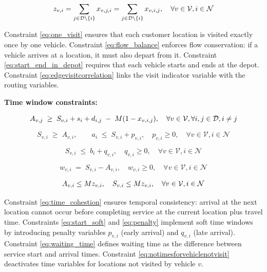\begin{equation}{\label{eq:edgevisitcorrelation}}
    z_{v,i} = \sum_{j\in \mathcal{D}\setminus\{i\}}x_{v,j,i} = \sum_{j\in \mathcal{D}\setminus\{i\}}x_{v,i,j}, \quad \forall v \in \mathcal{V}, i \in \mathcal{N}
\end{equation}

Constraint \ref{eq:one_visit} ensures that each customer location is visited exactly once by one vehicle. Constraint \ref{eq:flow_balance} enforces flow conservation: if a vehicle arrives at a location, it must also depart from it. Constraint \ref{eq:start_end_in_depot} requires that each vehicle starts and ends at the depot. Constraint \ref{eq:edgevisitcorrelation} links the visit indicator variable with the routing variables.

\textbf{Time window constraints:}

\begin{equation}{\label{eq:time_cohestion}}
 A_{v,j} \;\ge\; S_{v,i} + s_i + d_{i,j} \;-\; M(1 - x_{v,i,j}), \quad \forall v \in \mathcal{V}, \forall i,j \in \mathcal{D}, i\neq j
\end{equation}

\begin{equation}\label{eq:start_soft}
S_{v,i} \;\ge\; A_{v,i}, \qquad a_i \;\le\; S_{v,i} + p_{v,i}, \quad p_{v,i}\ge 0, \quad \forall v \in \mathcal{V}, i \in \mathcal{N}
\end{equation}

\begin{equation}\label{eq:penalty}
S_{v,i} \;\le\; b_i + q_{v,i}, \quad q_{v,i}\ge 0, \quad \forall v \in \mathcal{V}, i \in \mathcal{N}
\end{equation}

\begin{equation}\label{eq:waiting_time}
w_{v,i} \;=\; S_{v,i} - A_{v,i}, \quad w_{v,i}\ge 0, \quad \forall v \in \mathcal{V}, i \in \mathcal{N}
\end{equation}

\begin{equation}{\label{eq:notimesforvehiclenotvisit}}
    A_{v,i}\leq M z_{v,i}, \quad S_{v,i}\leq M z_{v,i}, \quad \forall v \in \mathcal{V}, i \in \mathcal{N}
\end{equation}

Constraint \eqref{eq:time_cohestion} ensures temporal consistency: arrival at the next location cannot occur before completing service at the current location plus travel time. Constraints \eqref{eq:start_soft} and \eqref{eq:penalty} implement soft time windows by introducing penalty variables $p_{v,i}$ (early arrival) and $q_{v,i}$ (late arrival). Constraint \eqref{eq:waiting_time} defines waiting time as the difference between service start and arrival times. Constraint \eqref{eq:notimesforvehiclenotvisit} deactivates time variables for locations not visited by vehicle $v$.

